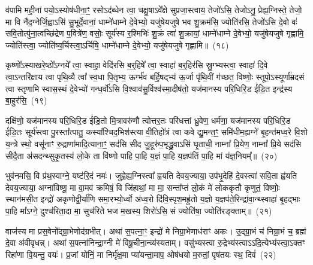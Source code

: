 व॑पामि मही॒नां पयो॒\-ऽस्योष॑धीना॒ꣳ॒ रसो\-ऽद॑ब्धेन त्वा॒ चक्षु॒षा\-ऽवे᳚क्षे सुप्रजा॒स्त्वाय॒ तेजो॑\-ऽसि॒ तेजो\-ऽनु॒ प्रेह्य॒ग्निस्ते॒ तेजो॒ मा वि नै॑द॒ग्नेर्जि॒ह्वा\-ऽसि॑ सु॒भूर्दे॒वानां॒ धाम्ने॑धाम्ने दे॒वेभ्यो॒ यजु॑षेयजुषे भव शु॒क्रम॑सि॒ ज्योति॑रसि॒ तेजो॑\-ऽसि दे॒वो वः॑ सवि॒तोत्पु॑ना॒त्वच्छि॑द्रेण प॒वित्रे॑ण॒ वसोः॒ सूर्य॑स्य र॒श्मिभिः॑ शु॒क्रं त्वा॑ शु॒क्रायां॒ धाम्ने॑धाम्ने दे॒वेभ्यो॒ यजु॑षेयजुषे गृह्णामि॒ ज्योति॑स्त्वा॒ ज्योति॑ष्य॒र्चिस्त्वा॒\-ऽर्चिषि॒ धाम्ने॑धाम्ने दे॒वेभ्यो॒ यजु॑षेयजुषे गृह्णामि॥~(१८)

{\anuvakamend[{उप॒ नी र॒श्मिभिः॑ शु॒क्रꣳ षोड॑श च}]}

कृष्णो᳚\-ऽस्याखरे॒ष्ठो᳚\-ऽग्नये᳚ त्वा॒ स्वाहा॒ वेदि॑रसि ब॒र्॒हिषे᳚ त्वा॒ स्वाहा॑ ब॒र्॒हिर॑सि स्रु॒ग्भ्यस्त्वा॒ स्वाहा॑ दि॒वे त्वा॒\-ऽन्तरि॑क्षाय त्वा पृथि॒व्यै त्वा᳚ स्व॒धा पि॒तृभ्य॒ ऊर्ग्भ॑व बर्\mbox{}हि॒षद्भ्य॑ ऊ॒र्जा पृ॑थि॒वीं ग॑च्छत॒ विष्णोः॒ स्तूपो॒\-ऽस्यूर्णा᳚म्रदसं त्वा स्तृणामि स्वास॒स्थं दे॒वेभ्यो॑ गन्ध॒र्वो॑\-ऽसि वि॒श्वाव॑सु॒र्विश्व॑स्मा॒दीष॑तो॒ यज॑मानस्य परि॒धिरि॒ड ई॑डि॒त इन्द्र॑स्य बा॒हुर॑सि॒~(१९)

दक्षि॑णो॒ यज॑मानस्य परि॒धिरि॒ड ई॑डि॒तो मि॒त्रावरु॑णौ त्वोत्तर॒तः परि॑धत्तां ध्रु॒वेण॒ धर्म॑णा॒ यज॑मानस्य परि॒धिरि॒ड ई॑डि॒तः सूर्य॑स्त्वा पु॒रस्ता᳚त्पातु॒ कस्या᳚श्चिद॒भिश॑स्त्या वी॒तिहो᳚त्रं त्वा कवे द्यु॒मन्त॒ꣳ॒ समि॑धीम॒ह्यग्ने॑ बृ॒हन्त॑मध्व॒रे वि॒शो य॒न्त्रे स्थो॒ वसू॑नाꣳ रु॒द्राणा॑मादि॒त्याना॒ꣳ॒ सद॑सि सीद जु॒हूरु॑प॒भृद्ध्रु॒वा\-ऽसि॑ घृ॒ताची॒ नाम्ना᳚ प्रि॒येण॒ नाम्ना᳚ प्रि॒ये सद॑सि सीदै॒ता अ॑सदन्थ्सुकृ॒तस्य॑ लो॒के ता वि॑ष्णो पाहि पा॒हि य॒ज्ञं पा॒हि य॒ज्ञप॑तिं पा॒हि मां य॑ज्ञ॒नियम्᳚॥~(२०)

{\anuvakamend[{बा॒हुर॑सि प्रि॒ये सद॑सि पञ्च॑दश च}]}

भुव॑नमसि॒ वि प्र॑थ॒स्वाग्ने॒ यष्ट॑रि॒दं नमः॑। जुह्वेह्य॒ग्निस्त्वा᳚ ह्वयति देवय॒ज्याया॒ उप॑भृ॒देहि॑ दे॒वस्त्वा॑ सवि॒ता ह्व॑यति देवय॒ज्याया॒ अग्ना॑विष्णू॒ मा वा॒मव॑ क्रमिषं॒ वि जि॑हाथां॒ मा मा॒ सन्ता᳚प्तं लो॒कं मे॑ लोककृतौ कृणुतं॒ विष्णोः॒ स्थान॑मसी॒त इन्द्रो॑ अकृणोद्वी॒र्या॑णि समा॒रभ्यो॒र्ध्वो अ॑ध्व॒रो दि॑वि॒स्पृश॒मह्रु॑तो य॒ज्ञो य॒ज्ञप॑ते॒\-रिन्द्रा॑\-वा॒न्थ्स्वाहा॑ बृ॒हद्भाः पा॒हि मा᳚\-ऽग्ने॒ दुश्च॑रिता॒दा मा॒ सुच॑रिते भज म॒खस्य॒ शिरो॑\-ऽसि॒ सं ज्योति॑षा॒ ज्योति॑रङ्क्ताम्॥~(२१)

{\anuvakamend[{अह्रु॑त॒ एक॑विꣳशतिश्च}]}

वाज॑स्य मा प्रस॒वेनो᳚द्ग्रा॒भेणोद॑ग्रभीत्। अथा॑ स॒पत्ना॒ꣳ॒ इन्द्रो॑ मे निग्रा॒भेणाध॑राꣳ अकः। उ॒द्ग्रा॒भं च॑ निग्रा॒भं च॒ ब्रह्म॑ दे॒वा अ॑वीवृधन्न्। अथा॑ स॒पत्ना॑निन्द्रा॒ग्नी मे॑ विषू॒चीना॒न्व्य॑स्यताम्। वसु॑भ्यस्त्वा रु॒द्रेभ्य॑स्त्वा\-ऽऽ\-दि॒त्येभ्य॑स्त्वा॒\-ऽक्तꣳ रिहा॑णा वि॒यन्तु॒ वयः॑। प्र॒जां योनिं॒ मा निर्मृ॑क्ष॒मा प्या॑यन्ता॒माप॒ ओष॑धयो म॒रुतां॒ पृष॑तयः स्थ॒ दिवं॑~(२२)

